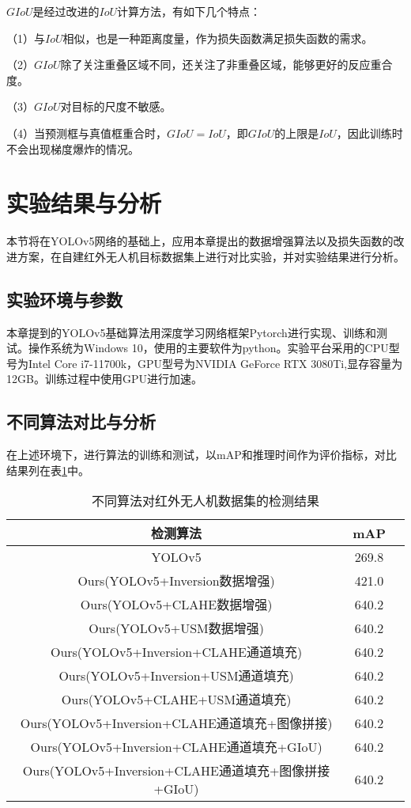$GIoU$是经过改进的$IoU$计算方法，有如下几个特点：

（1）与$IoU$相似，也是一种距离度量，作为损失函数满足损失函数的需求。

（2）$GIoU$除了关注重叠区域不同，还关注了非重叠区域，能够更好的反应重合度。

（3）$GIoU$对目标的尺度不敏感。

（4）当预测框与真值框重合时，$GIoU=IoU$，即$GIoU$的上限是$IoU$，因此训练时不会出现梯度爆炸的情况。

\section{实验结果与分析}
本节将在YOLOv5网络的基础上，应用本章提出的数据增强算法以及损失函数的改进方案，在自建红外无人机目标数据集上进行对比实验，并对实验结果进行分析。


\subsection{实验环境与参数}
本章提到的YOLOv5基础算法用深度学习网络框架Pytorch进行实现、训练和测试。操作系统为Windows 10，使用的主要软件为python。实验平台采用的CPU型号为Intel Core i7-11700k，GPU型号为NVIDIA GeForce RTX 3080Ti,显存容量为12GB。训练过程中使用GPU进行加速。

\subsection{不同算法对比与分析}
在上述环境下，进行算法的训练和测试，以mAP和推理时间作为评价指标，对比结果列在表\ref{m1}中。

\begin{table}[htbp]
  \caption{不同算法对红外无人机数据集的检测结果}
  \vspace{0.5em}\centering\wuhao
  \begin{tabular}{ccc}
  \toprule
  检测算法 & mAP\\
  \midrule
  YOLOv5 & 269.8\\
  Ours(YOLOv5+Inversion数据增强) & 421.0\\
  Ours(YOLOv5+CLAHE数据增强) & 640.2\\
  Ours(YOLOv5+USM数据增强) & 640.2\\
  Ours(YOLOv5+Inversion+CLAHE通道填充) & 640.2\\
  Ours(YOLOv5+Inversion+USM通道填充) & 640.2\\
  Ours(YOLOv5+CLAHE+USM通道填充) & 640.2\\
  Ours(YOLOv5+Inversion+CLAHE通道填充+图像拼接) & 640.2\\
  Ours(YOLOv5+Inversion+CLAHE通道填充+GIoU) & 640.2\\
  Ours(YOLOv5+Inversion+CLAHE通道填充+图像拼接+GIoU) & 640.2\\
  \bottomrule
  \end{tabular}
  \label{m1}
\end{table}

